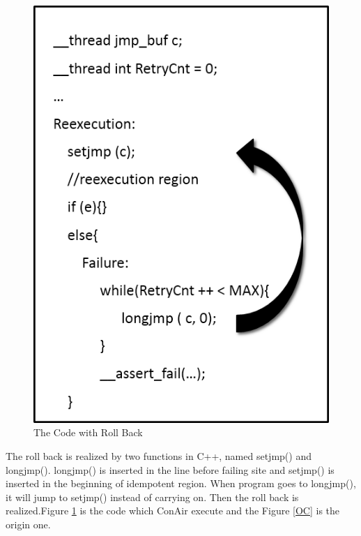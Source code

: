 \begin{figure}
\begin{minipage}[t]{0.48\linewidth}
\includegraphics[width=\textwidth]{figs/rollback_2.png}
\caption{The Code with Roll Back}
\label{After OC}
\end{minipage}
\end{figure}
The roll back is realized by two functions in C++, named setjmp() and longjmp(). longjmp() is inserted in the line before failing site and setjmp() is inserted in the beginning of idempotent region. When program goes to longjmp(), it will jump to setjmp() instead of carrying on. Then the roll back is realized.Figure \ref{After OC} is the code which ConAir execute and the Figure \ref{OC} is the origin one.

